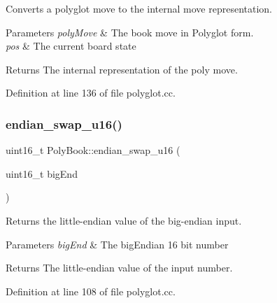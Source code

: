 Converts a polyglot move to the internal move representation. 


\begin{DoxyParams}{Parameters}
{\em poly\+Move} & The book move in Polyglot form. \\
\hline
{\em pos} & The current board state \\
\hline
\end{DoxyParams}
\begin{DoxyReturn}{Returns}
The internal representation of the poly move. 
\end{DoxyReturn}


Definition at line 136 of file polyglot.\+cc.

\mbox{\label{classPolyBook_a8b9892943292728371f789a813a27e08}} 
\subsubsection{\texorpdfstring{endian\+\_\+swap\+\_\+u16()}{endian\_swap\_u16()}}
{\footnotesize\ttfamily uint16\+\_\+t Poly\+Book\+::endian\+\_\+swap\+\_\+u16 (\begin{DoxyParamCaption}\item[{uint16\+\_\+t}]{big\+End }\end{DoxyParamCaption})\hspace{0.3cm}{\ttfamily [private]}}



Returns the little-\/endian value of the big-\/endian input. 


\begin{DoxyParams}{Parameters}
{\em big\+End} & The big\+Endian 16 bit number \\
\hline
\end{DoxyParams}
\begin{DoxyReturn}{Returns}
The little-\/endian value of the input number. 
\end{DoxyReturn}


Definition at line 108 of file polyglot.\+cc.

\mbox{\label{classPolyBook_afa6d55231591c049ca1944a68b41fe2e}} 
